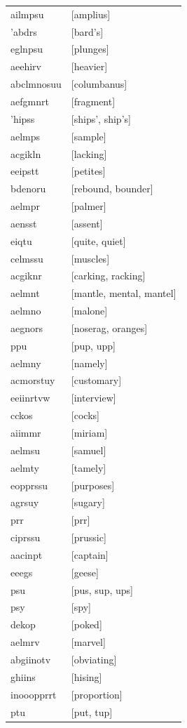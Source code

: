 \documentclass{article}
\begin{document}
\begin{tabular}{ll}
ailmpsu & [amplius] \\
'abdrs & [bard's] \\
eglnpsu & [plunges] \\
aeehirv & [heavier] \\
abclmnosuu & [columbanus] \\
aefgmnrt & [fragment] \\
'hipss & [ships', ship's] \\
aelmps & [sample] \\
acgikln & [lacking] \\
eeipstt & [petites] \\
bdenoru & [rebound, bounder] \\
aelmpr & [palmer] \\
aensst & [assent] \\
eiqtu & [quite, quiet] \\
celmssu & [muscles] \\
acgiknr & [carking, racking] \\
aelmnt & [mantle, mental, mantel] \\
aelmno & [malone] \\
aegnors & [noserag, oranges] \\
ppu & [pup, upp] \\
aelmny & [namely] \\
acmorstuy & [customary] \\
eeiinrtvw & [interview] \\
cckos & [cocks] \\
aiimmr & [miriam] \\
aelmsu & [samuel] \\
aelmty & [tamely] \\
eopprssu & [purposes] \\
agrsuy & [sugary] \\
prr & [prr] \\
ciprssu & [prussic] \\
aacinpt & [captain] \\
eeegs & [geese] \\
psu & [pus, sup, ups] \\
psy & [spy] \\
dekop & [poked] \\
aelmrv & [marvel] \\
abgiinotv & [obviating] \\
ghiins & [hising] \\
inooopprrt & [proportion] \\
ptu & [put, tup] \\

\end{tabular}
\end{document}
